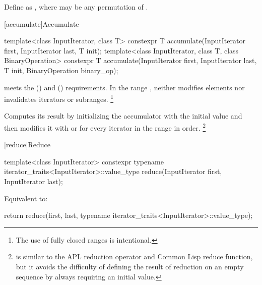 %
\pnum
Define  as
,
where
 may be any permutation of .

[accumulate]{Accumulate}

%
\begin{itemdecl}
template<class InputIterator, class T>
  constexpr T accumulate(InputIterator first, InputIterator last, T init);
template<class InputIterator, class T, class BinaryOperation>
  constexpr T accumulate(InputIterator first, InputIterator last, T init,
                         BinaryOperation binary_op);
\end{itemdecl}

\begin{itemdescr}
\pnum
\expects
{} meets
the  ()
and  () requirements.
In the range ,
 neither modifies elements
nor invalidates iterators or subranges.%
\footnote{The use of fully closed ranges is intentional.}

\pnum
\effects
Computes its result by
initializing the accumulator  with the initial value 
and then modifies it with
 or
for every iterator  in the range  in order.%
\footnote{ is similar
to the APL reduction operator and Common Lisp reduce function,
but it avoids the difficulty of defining the result of reduction
on an empty sequence by always requiring an initial value.}
\end{itemdescr}

[reduce]{Reduce}

%
\begin{itemdecl}
template<class InputIterator>
  constexpr typename iterator_traits<InputIterator>::value_type
    reduce(InputIterator first, InputIterator last);
\end{itemdecl}

\begin{itemdescr}
\pnum
\effects
Equivalent to:
\begin{codeblock}
return reduce(first, last,
              typename iterator_traits<InputIterator>::value_type{});
\end{codeblock}
\end{itemdescr}

